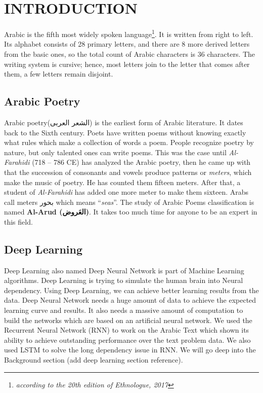 \chapter{\uppercase{Introduction}}



 

  Arabic is the fifth most widely spoken language\footnote{\textit{according to the 20th edition of Ethnologue, 2017}}. It is written from right to left. Its
alphabet consists of 28 primary letters, and there are 8 more derived letters
from the basic ones, so the total count of Arabic characters is 36 characters.
The writing system is cursive; hence, most letters join to the letter that comes
after them, a few letters remain disjoint.

\section{Arabic Poetry } %
Arabic poetry(\textarabic{الشعر العربى}) is the earliest form of Arabic literature. It dates back to the Sixth century. Poets have written poems without knowing exactly what rules which make a collection of words a poem. People recognize poetry by nature, but only talented ones can write poems. This was the case until \textit{Al-Farahidi} (718 – 786 CE) has analyzed the
Arabic poetry, then he came up with that the succession of consonants and vowels
produce patterns or \textit{meters}, which make the music of poetry.  He has
counted them fifteen meters.  After that, a student of \textit{Al-Farahidi} has
added one more meter to make them sixteen. Arabs call meters \textarabic{بحور}
which means ``\textit{seas}''. The study of Arabic Poems classification is named \textbf{Al-Arud (\textarabic{العَروض})}. It takes too much time for anyone to be an expert in this field. 
\section{Deep Learning}

Deep Learning also named Deep Neural Network is part of Machine Learning algorithms. Deep Learning is trying to simulate the human brain into Neural dependency.  Using Deep Learning, we can achieve better learning results from the data. Deep Neural Network needs a huge amount of data to achieve the expected learning curve and results. It also needs a massive amount of computation to build the networks which are based on an artificial neural network. We used the Recurrent Neural Network (RNN) to work on the Arabic Text which shown its ability to achieve outstanding performance over the text problem data. We also used LSTM to solve the long dependency issue in RNN. We will go deep into the Background section (add deep learning section reference).


